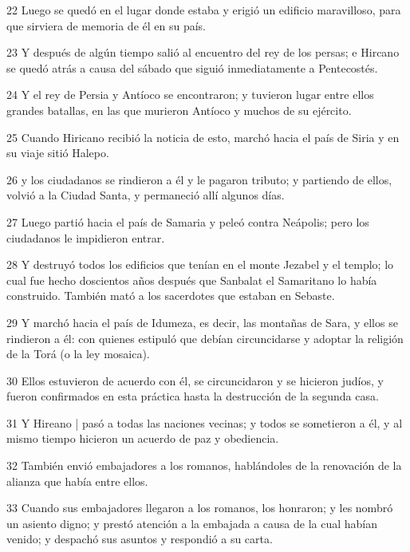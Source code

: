 \par 22 Luego se quedó en el lugar donde estaba y erigió un edificio maravilloso, para que sirviera de memoria de él en su país.

\par 23 Y después de algún tiempo salió al encuentro del rey de los persas; e Hircano se quedó atrás a causa del sábado que siguió inmediatamente a Pentecostés.

\par 24 Y el rey de Persia y Antíoco se encontraron; y tuvieron lugar entre ellos grandes batallas, en las que murieron Antíoco y muchos de su ejército.

\par 25 Cuando Hiricano recibió la noticia de esto, marchó hacia el país de Siria y en su viaje sitió Halepo.

\par 26 y los ciudadanos se rindieron a él y le pagaron tributo; y partiendo de ellos, volvió a la Ciudad Santa, y permaneció allí algunos días.

\par 27 Luego partió hacia el país de Samaria y peleó contra Neápolis; pero los ciudadanos le impidieron entrar.

\par 28 Y destruyó todos los edificios que tenían en el monte Jezabel y el templo; lo cual fue hecho doscientos años después que Sanbalat el Samaritano lo había construido. También mató a los sacerdotes que estaban en Sebaste.

\par 29 Y marchó hacia el país de Idumeza, es decir, las montañas de Sara, y ellos se rindieron a él: con quienes estipuló que debían circuncidarse y adoptar la religión de la Torá (o la ley mosaica).

\par 30 Ellos estuvieron de acuerdo con él, se circuncidaron y se hicieron judíos, y fueron confirmados en esta práctica hasta la destrucción de la segunda casa.

\par 31 Y Hireano | pasó a todas las naciones vecinas; y todos se sometieron a él, y al mismo tiempo hicieron un acuerdo de paz y obediencia.

\par 32 También envió embajadores a los romanos, hablándoles de la renovación de la alianza que había entre ellos.

\par 33 Cuando sus embajadores llegaron a los romanos, los honraron; y les nombró un asiento digno; y prestó atención a la embajada a causa de la cual habían venido; y despachó sus asuntos y respondió a su carta.

